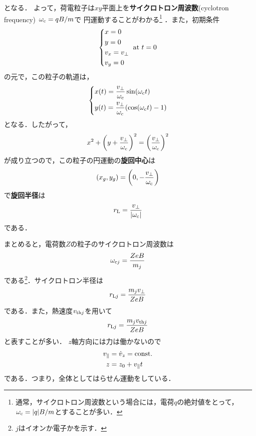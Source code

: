 \documentclass{report}
\begin{document}
      となる．
      よって，荷電粒子は$xy$平面上を\textbf{サイクロトロン周波数}(cyclotron frequency)\ $\omega_{\mathrm{c}} = qB/m$で
      円運動することがわかる\footnote{
        通常，サイクロトロン周波数という場合には，電荷$q$の絶対値をとって，$\omega_{\mathrm{c}} = |q|B/m$とすることが多い．
      }
      ．また，初期条件
      \begin{align}
        \begin{dcases}
          x = 0\\
          y = 0\\
          v_x = v_{\perp}\\
          v_y = 0
        \end{dcases}
        \ \mathrm{at}\ t = 0
      \end{align}
      の元で，この粒子の軌道は，
      \begin{align}
        \begin{dcases}
          x(t) = \frac{v_{\perp}}{\omega_{\mathrm{c}}}\sin(\omega_{\mathrm{c}}t)\\
          y(t) = \frac{v_{\perp}}{\omega_{\mathrm{c}}}(\cos(\omega_{\mathrm{c}}t)-1)
        \end{dcases}
      \end{align}
      となる．したがって，
      \begin{align}
        x^2 + \qty(y + \frac{v_{\perp}}{\omega_{\mathrm{c}}})^2 = \qty(\frac{v_{\perp}}{\omega_{\mathrm{c}}})^2
      \end{align}
      が成り立つので，この粒子の円運動の\textbf{旋回中心}は
      \begin{align}
        (x_g, y_g) = \qty(0, -\frac{v_{\perp}}{\omega_{\mathrm{c}}})
      \end{align}
      で\textbf{旋回半径}は
      \begin{align}
        r_{\mathrm{L}} = \frac{v_{\perp}}{\abs{\omega_{\mathrm{c}}}}
      \end{align}
      である．
      \par
      まとめると，電荷数$Z$の粒子のサイクロトロン周波数は
      \begin{align}
        \omega_{\mathrm{c}j} = \frac{Z e B}{m_j}
      \end{align}
      である\footnote{$j$はイオンか電子かを示す．}．サイクロトロン半径は
      \begin{align}
        r_{\mathrm{L}j} = \frac{m_j v_{\perp}}{ZeB}
      \end{align}
      である．また，熱速度$v_{{\mathrm{th}}j}$を用いて
      \begin{align}
        r_{\mathrm{L}j} = \frac{m_j v_{{\mathrm{th}}j}}{ZeB}
      \end{align}
      と表すことが多い．
      $z$軸方向には力は働かないので
      \begin{align}
        v_{\parallel} &= \dot{v}_z = \mathrm{const.}\\
        z &= z_0 + v_{\parallel}t
      \end{align}
      である．つまり，全体としてはらせん運動をしている．
\end{document}
